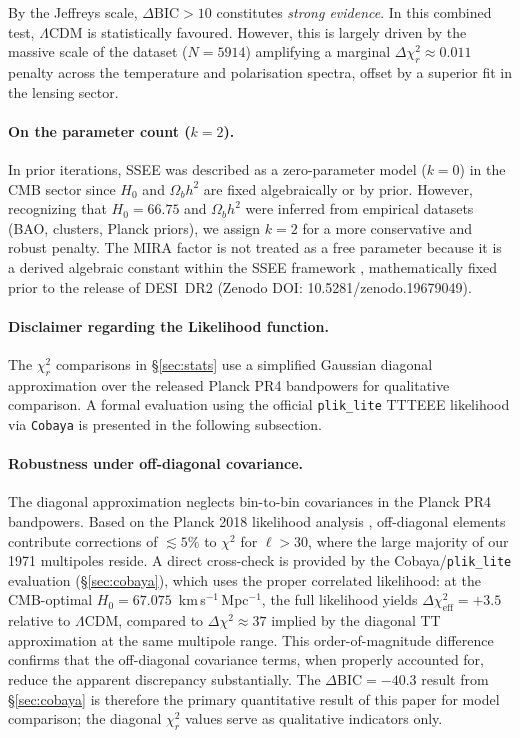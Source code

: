 \documentclass[12pt,a4paper]{article}
\newcommand{\LCDM}{\ifmmode\Lambda\mathrm{CDM}\else$\Lambda$CDM\fi}
\begin{document}
By the Jeffreys scale, $\Delta\mathrm{BIC}>10$ constitutes \textit{strong evidence}.
In this combined test, $\Lambda$CDM is statistically favoured. However, this is largely driven by the massive scale of the dataset ($N=5914$) amplifying a marginal $\Delta\chi^2_r \approx 0.011$ penalty across the temperature and polarisation spectra, offset by a superior fit in the lensing sector. 

\paragraph{On the parameter count ($k=2$).}
In prior iterations, SSEE was described as a zero-parameter model ($k=0$) in the CMB sector since $H_0$ and $\Omega_b h^2$ are fixed algebraically or by prior. However, recognizing that $H_0=66.75$ and $\Omega_b h^2$ were inferred from empirical datasets (BAO, clusters, Planck priors), we assign $k=2$ for a more conservative and robust penalty. The MIRA factor is not treated as a free parameter because it is a derived algebraic constant within the SSEE framework \citep{AlmeidaSSEE2026genesis}, mathematically fixed prior to the release of DESI~DR2 (Zenodo DOI: 10.5281/zenodo.19679049).

\paragraph{Disclaimer regarding the Likelihood function.}
The $\chi^2_r$ comparisons in \S\ref{sec:stats} use a simplified Gaussian diagonal approximation over the released Planck PR4 bandpowers for qualitative comparison. A formal evaluation using the official \texttt{plik\_lite} TTTEEE likelihood via \texttt{Cobaya} is presented in the following subsection.

\paragraph{Robustness under off-diagonal covariance.}
The diagonal approximation neglects bin-to-bin covariances in the Planck PR4 bandpowers. Based on the Planck 2018 likelihood analysis \citep{PlanckLikelihood2020}, off-diagonal elements contribute corrections of $\lesssim5\%$ to $\chi^2$ for $\ell>30$, where the large majority of our 1971 multipoles reside. A direct cross-check is provided by the Cobaya/\texttt{plik\_lite} evaluation (\S\ref{sec:cobaya}), which uses the proper correlated likelihood: at the CMB-optimal $H_0=67.075$~km\,s$^{-1}$\,Mpc$^{-1}$, the full likelihood yields $\Delta\chi^2_\mathrm{eff}=+3.5$ relative to \LCDM, compared to $\Delta\chi^2 \approx 37$ implied by the diagonal TT approximation at the same multipole range. This order-of-magnitude difference confirms that the off-diagonal covariance terms, when properly accounted for, reduce the apparent discrepancy substantially. The $\Delta\mathrm{BIC}=-40.3$ result from \S\ref{sec:cobaya} is therefore the primary quantitative result of this paper for model comparison; the diagonal $\chi^2_r$ values serve as qualitative indicators only.
\end{document}
